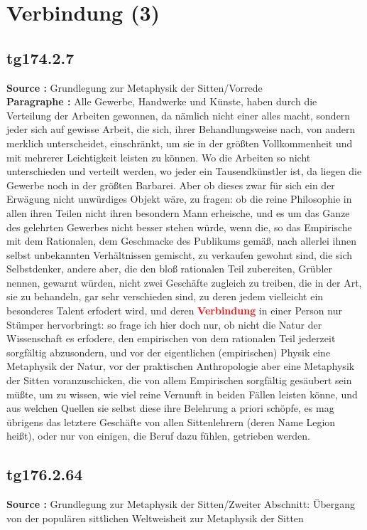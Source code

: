 \documentclass[a4paper,12pt,twoside]{book}
\newcommand{\match}[1]{\textcolor{red}{\textbf{#1}}}
\newcommand{\unnumberedsection}[1]{
	\section*{#1}
	\addcontentsline{toc}{section}{#1}
	\markright{#1}
}
\begin{document}
	\unnumberedsection{Verbindung (3)} 
	\subsection*{tg174.2.7} 
	\textbf{Source : }Grundlegung zur Metaphysik der Sitten/Vorrede\\  
	
	\noindent\textbf{Paragraphe : }Alle Gewerbe, Handwerke und Künste, haben durch die Verteilung der Arbeiten gewonnen, da nämlich nicht einer alles macht, sondern jeder sich auf gewisse Arbeit, die sich, ihrer Behandlungsweise nach, von andern merklich unterscheidet, einschränkt, um sie in der größten Vollkommenheit und mit mehrerer Leichtigkeit leisten zu können. Wo die Arbeiten so nicht unterschieden und verteilt werden, wo jeder ein Tausendkünstler ist, da liegen die Gewerbe noch in der größten Barbarei. Aber ob dieses zwar für sich ein der Erwägung nicht unwürdiges Objekt wäre, zu fragen: ob die reine Philosophie in allen ihren Teilen nicht ihren besondern Mann erheische, und es um das Ganze des gelehrten Gewerbes nicht besser stehen würde, wenn die, so das Empirische mit dem Rationalen, dem Geschmacke des Publikums gemäß, nach allerlei ihnen selbst unbekannten Verhältnissen gemischt, zu verkaufen gewohnt sind, die sich Selbstdenker, andere aber, die den bloß rationalen Teil zubereiten, Grübler nennen, gewarnt würden, nicht zwei Geschäfte zugleich zu treiben, die in der Art, sie zu behandeln, gar sehr verschieden sind, zu deren jedem vielleicht ein besonderes Talent erfodert wird, und deren \match{Verbindung} in einer Person nur Stümper hervorbringt: so frage ich hier doch nur, ob nicht die Natur der Wissenschaft es erfodere, den empirischen von dem rationalen Teil jederzeit sorgfältig abzusondern, und vor der eigentlichen (empirischen) Physik eine Metaphysik der Natur, vor der praktischen Anthropologie aber eine Metaphysik der Sitten voranzuschicken, die von allem Empirischen sorgfältig gesäubert sein müßte, um zu  wissen, wie viel reine Vernunft in beiden Fällen leisten könne, und aus welchen Quellen sie selbst diese ihre Belehrung a priori schöpfe, es mag übrigens das letztere Geschäfte von allen Sittenlehrern (deren Name Legion heißt), oder nur von einigen, die Beruf dazu fühlen, getrieben werden. 
	
	\subsection*{tg176.2.64} 
	\textbf{Source : }Grundlegung zur Metaphysik der Sitten/Zweiter Abschnitt: Übergang von der populären sittlichen Weltweisheit zur Metaphysik der Sitten\\  
	
\end{document}
